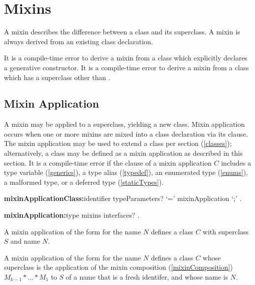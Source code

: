 \documentclass{article}
\begin{document}
\section{Mixins}

\LMHash{}
A mixin describes the difference between a class and its superclass.
A mixin is always derived from an existing class declaration.

\LMHash{}
It is a compile-time error to derive a mixin from a class which explicitly declares a generative constructor.
It is a compile-time error to derive a mixin from a class which has a superclass other than .



\subsection{Mixin Application}

\LMHash{}
A mixin may be applied to a superclass, yielding a new class.
Mixin application occurs when one or more mixins are mixed into a class declaration via its \WITH{} clause.
The mixin application may be used to extend a class per section (\ref{classes}); alternatively, a class may be defined as a mixin application as described in this section.
It is a compile-time error if the \WITH{} clause of a mixin application $C$ includes a type variable (\ref{generics}), a type alias (\ref{typedef}), an enumerated type (\ref{enums}), a malformed type, or a deferred type (\ref{staticTypes}).

\begin{grammar}
{\bf mixinApplicationClass:}identifier typeParameters? `=' mixinApplication `{\escapegrammar ;}'
  .

{\bf mixinApplication:}type mixins interfaces?
  .
\end{grammar}

\LMHash{}
A mixin application of the form  for the name $N$ defines a class $C$ with superclass $S$ and name $N$.

\LMHash{}
A mixin application of the form  for the name $N$ defines a class $C$ whose superclass is the application of the mixin composition (\ref{mixinComposition}) $M_{k-1} * \ldots * M_1$ to $S$ of a name that is a fresh identifer, and whose name is $N$.
\end{document}

